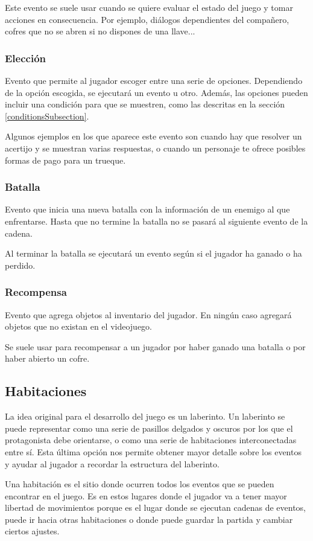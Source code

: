 Este evento se suele usar cuando se quiere evaluar el estado del juego y tomar acciones en consecuencia. Por ejemplo, diálogos dependientes del compañero, cofres que no se abren si no dispones de una llave...

\subsubsection{Elección}
Evento que permite al jugador escoger entre una serie de opciones. Dependiendo de la opción escogida, se ejecutará un evento u otro. Además, las opciones pueden incluir una condición para que se muestren, como las descritas en la sección \ref{conditionsSubsection}.

Algunos ejemplos en los que aparece este evento son cuando hay que resolver un acertijo y se muestran varias respuestas, o cuando un personaje te ofrece posibles formas de pago para un trueque.

\subsubsection{Batalla}
Evento que inicia una nueva batalla con la información de un enemigo al que enfrentarse.
Hasta que no termine la batalla no se pasará al siguiente evento de la cadena.

Al terminar la batalla se ejecutará un evento según si el jugador ha ganado o ha perdido.

\subsubsection{Recompensa}
Evento que agrega objetos al inventario del jugador. En ningún caso agregará objetos que no existan en el videojuego.

Se suele usar para recompensar a un jugador por haber ganado una batalla o por haber abierto un cofre.

\subsection{Habitaciones}
La idea original para el desarrollo del juego es un laberinto. Un laberinto se puede representar como una serie de pasillos delgados y oscuros por los que el protagonista debe orientarse, o como una serie de habitaciones interconectadas entre sí.
Esta última opción nos permite obtener mayor detalle sobre los eventos y ayudar al jugador a recordar la estructura del laberinto. 

Una habitación es el sitio donde ocurren todos los eventos que se pueden encontrar en el juego. Es en estos lugares donde el jugador va a tener mayor libertad de movimientos porque es el lugar donde se ejecutan cadenas de eventos, puede ir hacia otras habitaciones o donde puede guardar la partida y cambiar ciertos ajustes.


